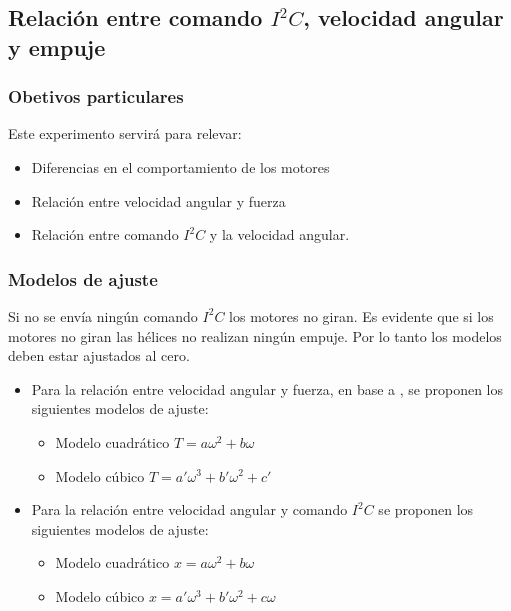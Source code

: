 \documentclass[main]{subfiles}
\begin{document}
\subsection{Relaci\'on entre comando $I^2C$, velocidad angular y empuje}

\subsubsection*{Obetivos particulares}
Este experimento servir\'a para relevar:
\begin{itemize}
\item Diferencias en el comportamiento de los motores
\item Relaci\'on entre velocidad angular y fuerza
\item Relaci\'on entre comando $I^2C$ y la velocidad angular.
\end{itemize}

\subsubsection*{Modelos de ajuste}

Si no se env\'ia ning\'un comando $I^2C$ los motores no giran. Es evidente que si los motores no giran las h\'elices no realizan ning\'un empuje. Por lo tanto los modelos deben estar ajustados al cero. 
\begin{itemize}


\item Para la relaci\'on entre velocidad angular y fuerza, en base a \cite{bib:fuerzas-helices}, se proponen los siguientes modelos de ajuste:

	\begin{itemize}
	\item Modelo cuadr\'atico $T=a\omega^2+b\omega$
	\item Modelo c\'ubico $T=a\prime \omega^3+b\prime \omega^2+c\prime$
	\end{itemize}

\item Para la relaci\'on entre velocidad angular y comando $I^2C$ se proponen los siguientes modelos de ajuste:
	\begin{itemize}
	\item Modelo cuadr\'atico $x=a\omega^2+b\omega$
	\item Modelo c\'ubico $x =a\prime \omega^3+b\prime \omega^2+c\omega$	
	
	\end{itemize}


\end{itemize}
\end{document}
